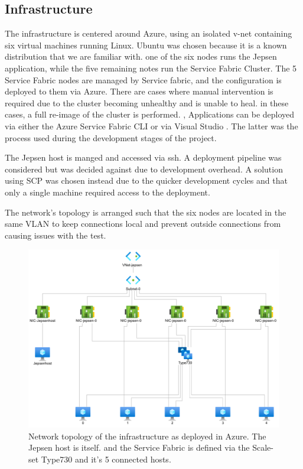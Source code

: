 \documentclass[a4paper,10pt,titlepage]{report}
\begin{document}
    \subsection{Infrastructure}
    The infrastructure is centered around Azure, using an isolated v-net containing six virtual machines running Linux. Ubuntu was chosen because it is a known distribution that we are familiar with. one of the six nodes runs the Jepsen application, while the five remaining notes run the Service Fabric Cluster.
    The 5 Service Fabric nodes are managed by Service fabric, and the configuration is deployed to them via Azure. There are cases where manual intervention is required due to the cluster becoming unhealthy and is unable to heal. in these cases, a full re-image of the cluster is performed. ,  Applications can be deployed via either the Azure Service Fabric CLI \cite{servicefabriccli} or via Visual Studio \cite{servicefabricguide}. The latter was the process used during the development stages of the project.

    The Jepsen host is manged and accessed via ssh. A deployment pipeline was considered but was decided against due to development overhead. A solution using SCP was chosen instead due to the quicker development cycles and that only a single machine required access to the deployment. 
    

    The network's topology is arranged such that the six nodes are located in the same VLAN to keep connections local and prevent outside connections from causing issues with the test.\\
    \begin{figure}[h!]
        \centering
        \includegraphics[scale=0.5]{images/azure_network_topology.png}
        \caption{Network topology of the infrastructure as deployed in Azure. The Jepsen host is itself. and the Service Fabric is defined via the Scale-set Type730 and it's 5 connected hosts.}
    \end{figure}
\end{document}
